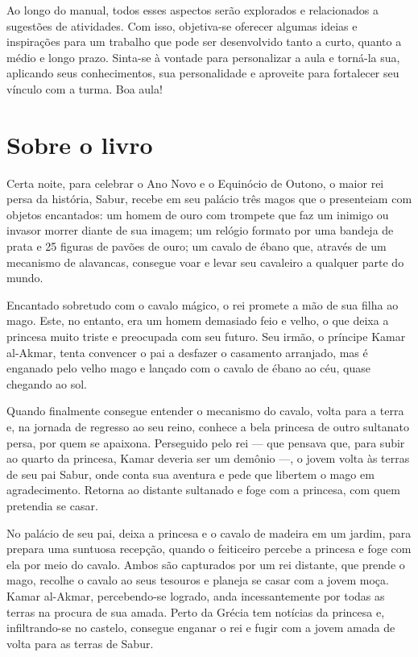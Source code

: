 \documentclass[11pt]{extarticle}
\begin{document}
Ao longo do manual, todos esses aspectos serão explorados e relacionados a sugestões de atividades. Com isso, objetiva-se oferecer algumas ideias e inspirações para um trabalho que pode ser desenvolvido tanto a curto, quanto a médio e longo prazo. Sinta-se à vontade para personalizar a aula e torná-la sua, aplicando seus conhecimentos, sua 
personalidade e aproveite para fortalecer seu vínculo com a turma.
Boa aula!

\section{Sobre o livro}
Certa noite, para celebrar o Ano Novo e o Equinócio de Outono, o maior rei persa da história, Sabur, recebe em seu palácio três magos que o presenteiam com objetos encantados: um homem de ouro com trompete que faz um inimigo ou invasor morrer diante de sua imagem; um relógio formato por uma bandeja de prata e 25 figuras de pavões de ouro; um cavalo de ébano que, através de um mecanismo de alavancas, consegue voar e levar seu cavaleiro a qualquer parte do mundo.

Encantado sobretudo com o cavalo mágico, o rei promete a mão de sua filha ao mago. Este, no entanto, era um homem demasiado feio e velho, o que deixa a princesa muito triste e preocupada com seu futuro. Seu irmão, o príncipe Kamar al-Akmar, tenta convencer o pai a desfazer o casamento arranjado, mas é enganado pelo velho mago e lançado com o cavalo de ébano ao céu, quase chegando ao sol.

Quando finalmente consegue entender o mecanismo do cavalo, volta para a terra e, na jornada de regresso ao seu reino, conhece a bela princesa de outro sultanato persa, por quem se apaixona. Perseguido pelo rei --- que pensava que, para subir ao quarto da princesa, Kamar deveria ser um demônio ---, o jovem volta às terras de seu pai Sabur, onde conta sua aventura e pede que libertem o mago em agradecimento. Retorna ao distante sultanado e foge com a princesa, com quem pretendia se casar.

No palácio de seu pai, deixa a princesa e o cavalo de madeira em um jardim, para prepara uma suntuosa recepção, quando o feiticeiro percebe a princesa e foge com ela por meio do cavalo. Ambos são capturados por um rei distante, que prende o mago, recolhe o cavalo ao seus tesouros e planeja se casar com a jovem moça. Kamar al-Akmar, percebendo-se logrado, anda incessantemente por todas as terras na procura de sua amada. Perto da Grécia tem notícias da princesa e, infiltrando-se no castelo, consegue enganar o rei e fugir com a jovem amada de volta para as terras de Sabur.
\end{document}

